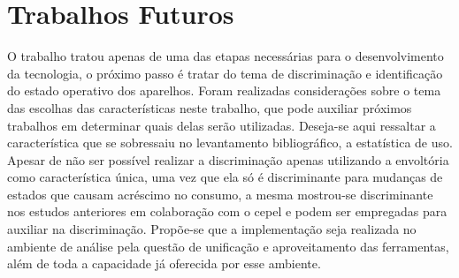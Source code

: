


\section{Trabalhos Futuros}
\label{sec:trabfut}

O trabalho tratou apenas de uma das etapas necessárias para o
desenvolvimento da tecnologia, o próximo passo é tratar do tema de
discriminação e identificação do estado operativo dos aparelhos.
Foram realizadas considerações sobre o tema das escolhas das
características neste trabalho, que pode auxiliar próximos trabalhos
em determinar quais delas serão utilizadas. Deseja-se aqui ressaltar a
característica que se sobressaiu no levantamento bibliográfico, a
estatística de uso. Apesar de não ser possível realizar a
discriminação apenas utilizando a envoltória como característica
única, uma vez que ela só é discriminante para mudanças de estados que
causam acréscimo no consumo, a mesma mostrou-se discriminante nos
estudos anteriores em colaboração com o \acs{cepel} e podem ser
empregadas para auxiliar na discriminação. Propõe-se que a
implementação seja realizada no ambiente de análise pela questão de
unificação e aproveitamento das ferramentas, além de toda a capacidade
já oferecida por esse ambiente.

